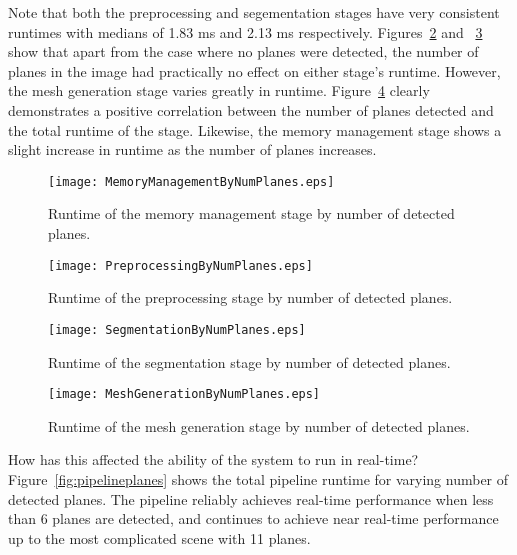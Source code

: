 Note that both the preprocessing and segementation stages have very consistent runtimes with medians of 1.83 ms and 2.13 ms respectively. Figures~\ref{fig:preprocessingplanes} and ~\ref{fig:segementationplanes} show that apart from the case where no planes were detected, the number of planes in the image had practically no effect on either stage's runtime. However, the mesh generation stage varies greatly in runtime. Figure~\ref{fig:meshgenerationplanes} clearly demonstrates a positive correlation between the number of planes detected  and the total runtime of the stage. Likewise, the memory management stage shows a slight increase in runtime as the number of planes increases.\par

\begin{figure}[!htpb]
    \centering
    \texttt{[image: MemoryManagementByNumPlanes.eps]}
    \caption{Runtime of the memory management stage by number of detected planes.}
    \label{fig:memorymangementplanes}
\end{figure}


\begin{figure}[!htpb]
    \centering
    \texttt{[image: PreprocessingByNumPlanes.eps]}
    \caption{Runtime of the preprocessing stage by number of detected planes.}
    \label{fig:preprocessingplanes}
\end{figure}



\begin{figure}[!htpb]
    \centering
    \texttt{[image: SegmentationByNumPlanes.eps]}
    \caption{Runtime of the segmentation stage by number of detected planes.}
    \label{fig:segementationplanes}
\end{figure}



\begin{figure}[!htpb]
    \centering
    \texttt{[image: MeshGenerationByNumPlanes.eps]}
    \caption{Runtime of the mesh generation stage by number of detected planes.}
    \label{fig:meshgenerationplanes}
\end{figure}

How has this affected the ability of the system to run in real-time? Figure~\ref{fig:pipelineplanes} shows the total pipeline runtime for varying number of detected planes. The pipeline reliably achieves real-time performance when less than 6 planes are detected, and continues to achieve near real-time performance up to the most complicated scene with 11 planes.

